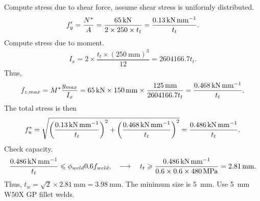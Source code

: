 \begin{solution}
Compute stress due to shear force, assume shear stress is uniformly distributed.
\begin{gather*}
f'_y=\dfrac{N^*}{A}=\dfrac{\SI{65}{\kilo\newton}}{2\times250\times{}t_t}=\dfrac{\SI{0.13}{\kilo\newton\per\milli\meter}}{t_t}.
\end{gather*}
Compute stress due to moment.
\begin{gather*}
I_x=2\times\dfrac{t_t\times\left(\SI{250}{\mm}\right)^3}{12}=2604166.7t_t.
\end{gather*}
Thus,
\begin{gather*}
f_{z,max}=M^*\dfrac{y_{max}}{I_x}=\SI{65}{\kilo\newton}\times\SI{150}{\milli\meter}\times\dfrac{\SI{125}{\milli\meter}}{2604166.7t_t}=\dfrac{\SI{0.468}{\kilo\newton\per\milli\meter}}{t_t}.
\end{gather*}
The total stress is then
\begin{gather*}
f_u^*=\sqrt{\left(\dfrac{\SI{0.13}{\kilo\newton\per\milli\meter}}{t_t}\right)^2+\left(\dfrac{\SI{0.468}{\kilo\newton\per\milli\meter}}{t_t}\right)^2}=\dfrac{\SI{0.486}{\kilo\newton\per\milli\meter}}{t_t}.
\end{gather*}
Check capacity.
\begin{gather*}
\dfrac{\SI{0.486}{\kilo\newton\per\milli\meter}}{t_t}\leqslant\phi_{weld}0.6f_{weld},\quad\longrightarrow\quad
t_t\geqslant\dfrac{\SI{0.486}{\kilo\newton\per\milli\meter}}{0.6\times0.6\times\SI{480}{\mega\pascal}}=\SI{2.81}{\milli\meter}.
\end{gather*}
Thus, $t_w=\sqrt{2}\times\SI{2.81}{\mm}=\SI{3.98}{\mm}$.
The minimum size is \SI{5}{\mm}.
Use \SI{5}{\mm} W50X GP fillet welds.
\end{solution}
